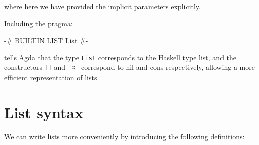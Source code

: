 where here we have provided the implicit parameters explicitly.

Including the pragma:

\begin{myDisplay}
{-# BUILTIN LIST List #-}
\end{myDisplay}

tells Agda that the type \texttt{List} corresponds to the Haskell type
list, and the constructors \texttt{{[}{]}} and \texttt{\_∷\_} correspond
to nil and cons respectively, allowing a more efficient representation
of lists.

\hypertarget{list-syntax}{%
\section{List syntax}\label{list-syntax}}

We can write lists more conveniently by introducing the following
definitions:

